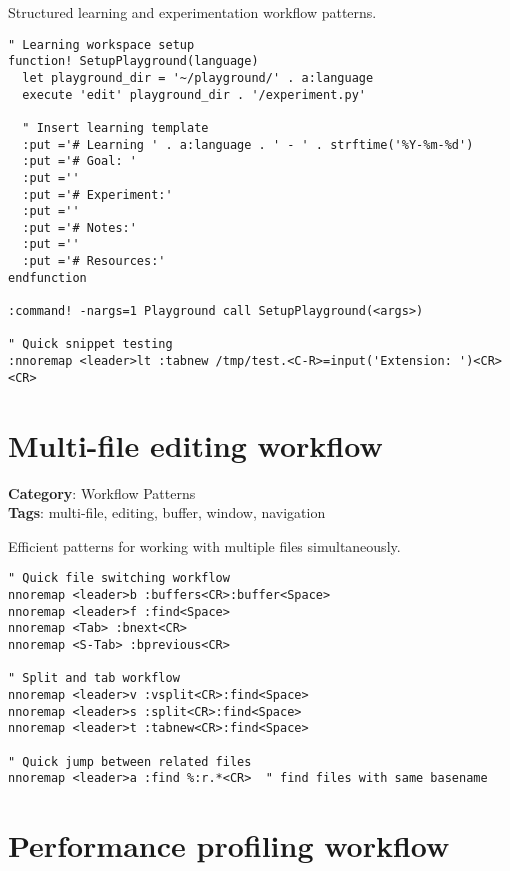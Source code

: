 {{{{{{{{{{{{{{{{{{{Structured learning and experimentation workflow patterns.

\begin{Exa*}{}
\begin{Verbatim}[fontsize=\footnotesize, breaklines, breakanywhere]
" Learning workspace setup
function! SetupPlayground(language)
  let playground_dir = '~/playground/' . a:language
  execute 'edit' playground_dir . '/experiment.py'
  
  " Insert learning template
  :put ='# Learning ' . a:language . ' - ' . strftime('%Y-%m-%d')
  :put ='# Goal: '
  :put =''
  :put ='# Experiment:'
  :put =''
  :put ='# Notes:'
  :put =''
  :put ='# Resources:'
endfunction

:command! -nargs=1 Playground call SetupPlayground(<args>)

" Quick snippet testing
:nnoremap <leader>lt :tabnew /tmp/test.<C-R>=input('Extension: ')<CR><CR>
\end{Verbatim}
\end{Exa*}

\section{Multi-file editing workflow}

\textbf{Category}: Workflow Patterns\\ \textbf{Tags}: multi-file, editing, buffer, window, navigation
\vspace{0.5cm}

Efficient patterns for working with multiple files simultaneously.

\begin{Exa*}{}
\begin{Verbatim}[fontsize=\footnotesize, breaklines, breakanywhere]
" Quick file switching workflow
nnoremap <leader>b :buffers<CR>:buffer<Space>
nnoremap <leader>f :find<Space>
nnoremap <Tab> :bnext<CR>
nnoremap <S-Tab> :bprevious<CR>

" Split and tab workflow
nnoremap <leader>v :vsplit<CR>:find<Space>
nnoremap <leader>s :split<CR>:find<Space>  
nnoremap <leader>t :tabnew<CR>:find<Space>

" Quick jump between related files
nnoremap <leader>a :find %:r.*<CR>  " find files with same basename
\end{Verbatim}
\end{Exa*}

\section{Performance profiling workflow}

}}}}}}}}}}}}}}}}}}}
